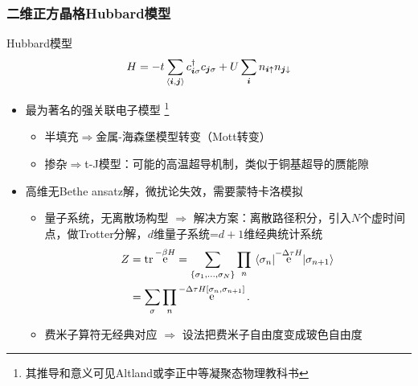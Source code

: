 \documentclass[UTF8]{ctexbeamer}
\DeclareMathOperator{\ee}{e}
\newcommand{\pair}[1]{\langle #1 \rangle}
\begin{document}
\begin{frame}
\frametitle{二维正方晶格Hubbard模型}

Hubbard模型
\begin{equation}
    H = - t\sum_{\pair{\vb*{i}, \vb*{j}}} c^\dagger_{\vb*{i} \sigma} c_{\vb*{j} \sigma} + U \sum_{\vb*{i}} n_{\vb*{i} \uparrow} n_{\vb*{j} \downarrow}
\end{equation}    
\begin{itemize}
    \item 最为著名的强关联电子模型%
    \footnote{其推导和意义可见Altland或李正中等凝聚态物理教科书}%
    \begin{itemize}
        \item 半填充$\Rightarrow$金属-海森堡模型转变（Mott转变）
        \item 掺杂$\Rightarrow$t-J模型：可能的高温超导机制，类似于铜基超导的赝能隙
    \end{itemize}
    \item 高维无Bethe ansatz解，微扰论失效，需要蒙特卡洛模拟
    \begin{itemize}
        \item 量子系统，无离散场构型 $\Rightarrow$ 解决方案：离散路径积分，引入$N$个虚时间点，做Trotter分解，$d$维量子系统=$d+1$维经典统计系统
        \begin{equation}
            \begin{aligned}
                Z &= \trace \ee^{- \beta H} = \sum_{\{ \sigma_1, \ldots, \sigma_N \}} \prod_{n} \mel{\sigma_n}{\ee^{- \Delta \tau H}}{\sigma_{n+1}} \\
                &= \sum_\sigma \prod_n \ee^{- \Delta \tau H[\sigma_n, \sigma_{n+1}]}.
            \end{aligned}
        \end{equation}
        \item 费米子算符无经典对应 $\Rightarrow$ 设法把费米子自由度变成玻色自由度
    \end{itemize}
\end{itemize}

\end{frame}
\end{document}
